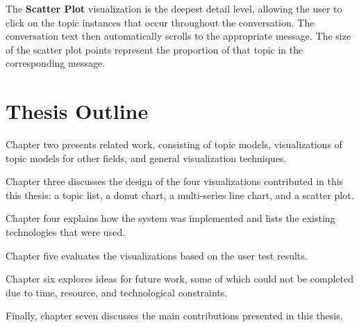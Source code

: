 The \textbf{Scatter Plot} visualization is the deepest detail level, allowing the user to
click on the topic instances that occur throughout the conversation. The conversation
text then automatically scrolls to the appropriate message. The size of the scatter plot
points represent the proportion of that topic in the corresponding message.

\section{Thesis Outline}

Chapter two presents related work, consisting of topic models, visualizations of
topic models for other fields, and general visualization techniques.

Chapter three discusses the design of the four visualizations contributed in this
this thesis: a topic list, a donut chart, a multi-series line chart, and a scatter plot.

Chapter four explains how the system was implemented and lists the existing
technologies that were used.

Chapter five evaluates the visualizations based on the user test results.

Chapter six explores ideas for future work, some of which could not be completed
due to time, resource, and technological constraints.

Finally, chapter seven discusses the main contributions presented in this thesis.
